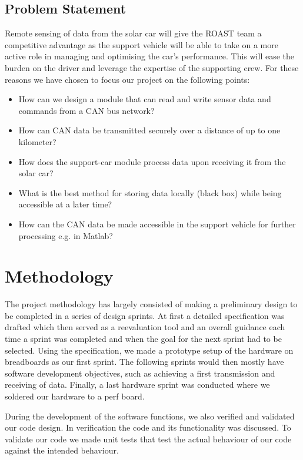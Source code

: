 \documentclass[conference]{IEEEtran}
\begin{document}
\subsection{Problem Statement}
Remote sensing of data from the solar car will give the ROAST team a competitive advantage as the support vehicle will be able to take on a more active role in managing and optimising the car's performance. This will ease the burden on the driver and leverage the expertise of the supporting crew. For these reasons we have chosen to focus our project on the following points:
\begin{itemize}
    \item How can we design a module that can read and write sensor data and commands from a CAN bus network? 
    \item How can CAN data be transmitted securely over a distance of up to one kilometer?
    \item How does the support-car module process data upon receiving it from the solar car?
    \item What is the best method for storing data locally (black box) while being accessible at a later time?
    \item How can the CAN data be made accessible in the support vehicle for further processing e.g. in Matlab?
\end{itemize}

\section{Methodology}
The project methodology has largely consisted of making a preliminary design to be completed in a series of design sprints. At first a detailed specification was drafted which then served as a reevaluation tool and an overall guidance each time a sprint was completed and when the goal for the next sprint had to be selected. Using the specification, we made a prototype setup of the hardware on breadboards as our first sprint. The following sprints would then mostly have software development objectives, such as achieving a first transmission and receiving of data. Finally, a last hardware sprint was conducted where we soldered our hardware to a perf board.

During the development of the software functions, we also verified and validated our code design. In verification the code and its functionality was discussed. To validate our code we made unit tests that test the actual behaviour of our code against the intended behaviour.
\end{document}

